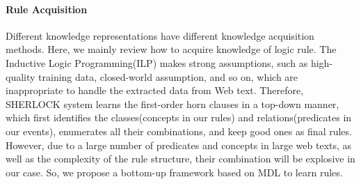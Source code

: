 \paragraph{Rule Acquisition} 
Different knowledge representations have different knowledge acquisition methods.
Here, we mainly review how to acquire knowledge of logic rule. 
The Inductive Logic Programming(ILP)\cite{Quinlan1990,Bergadano1996,Muggleton1997} makes strong assumptions, such as high-quality training data, closed-world assumption, and so on, which are inappropriate to handle the extracted data from Web text.
Therefore, SHERLOCK system \cite{Schoenmackers2010} learns the first-order horn clauses in a top-down manner, which first identifies the classes(concepts in our rules) and relations(predicates in our events), enumerates all their combinations, and keep good ones as final rules. 
However, due to a large number of predicates and concepts in large web texts, as well as the complexity of the rule structure, their combination will be explosive in our case.
So, we propose a bottom-up framework based on MDL to learn rules.




